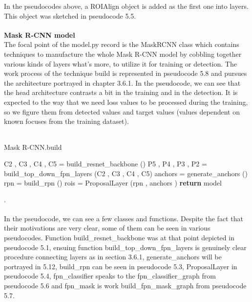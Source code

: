 In the pseudocodes above, a ROIAlign object is added as the first one into layers. This object was sketched in pseudocode 5.5.
\\
\\
\textbf{Mask R-CNN model}
\\
The focal point of the model.py record is the MaskRCNN class which contains techniques to manufacture the whole Mask R-CNN model by cobbling together various kinds of layers 
what's more, to utilize it for training or detection. The work process of the technique build is represented in pseudocode 5.8 and pursues 
the architecture portrayed in chapter 3.6.1. In the pseudocode, we can see that the head architecture contrasts a bit in the training and in the detection. It is expected to 
the way that we need loss values to be processed during the training, so we figure them from detected values and target values (values dependent on known focuses from 
the training dataset).
\\
\\
\begin{algorithm}[H]
  \caption{Mask R-CNN.build}
  \SetAlgoLined
  \DontPrintSemicolon
 C2 , C3 , C4 , C5 = build\_resnet\_backbone ()\;
 P5 , P4 , P3 , P2 = build\_top\_down\_fpn\_layers (C2 , C3 , C4 , C5)\;
 anchors = generate\_anchors ()\;
 rpn = build\_rpn ()\;
 rois = ProposalLayer (rpn , anchors )\;
 \textbf{return} model\;
\end{algorithm}
.\\
\\ 
In the pseudocode, we can see a few classes and functions. Despite the fact that their motivations are very clear, some of them can be seen in various pseudocodes. Function
build\_resnet\_backbone was at that point depicted in pseudocode 5.1, ensuing function build\_top\_down\_fpn\_layers is genuinely clear procedure connecting layers 
as in section 3.6.1, generate\_anchors will be portrayed in 5.12, build\_rpn can be seen in pseudocode 5.3, ProposalLayer in pseudocode 5.4, fpn\_classifier speaks to the fpn\_classifier\_graph from pseudocode 5.6 and fpn\_mask is work 
build\_fpn\_mask\_graph from pseudocode 5.7.

